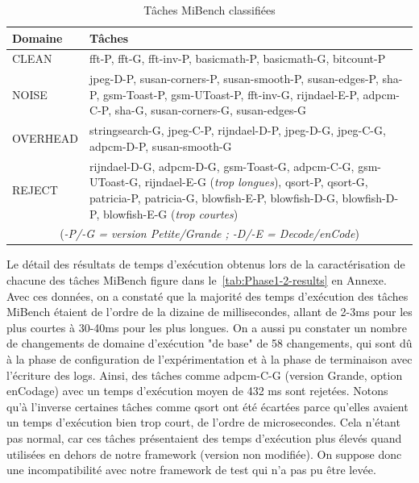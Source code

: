 \documentclass[french, a4paper, 11pt, twoside, pdftex]{StyleThese}
\begin{document}
\begin{table}[ht]
	\caption{Tâches MiBench classifiées}
	\label{tab:MiBench_classify}
	\centering
	\begin{tabularx}{\textwidth}{lX} %
		\toprule
		Domaine		& Tâches					\\
		\midrule
		CLEAN  		& fft-P, fft-G, fft-inv-P, basicmath-P, basicmath-G, bitcount-P						\\
		NOISE     	& jpeg-D-P, susan-corners-P, susan-smooth-P, susan-edges-P, sha-P, gsm-Toast-P, gsm-UToast-P, fft-inv-G, rijndael-E-P, adpcm-C-P, sha-G, susan-corners-G, susan-edges-G 		   					\\
		OVERHEAD    & stringsearch-G, jpeg-C-P, rijndael-D-P, jpeg-D-G, jpeg-C-G, adpcm-D-P, susan-smooth-G	   	\\
		REJECT      & rijndael-D-G, adpcm-D-G, gsm-Toast-G, adpcm-C-G, gsm-UToast-G, rijndael-E-G (\textit{trop longues}), qsort-P, qsort-G, patricia-P, patricia-G, blowfish-E-P, blowfish-D-G, blowfish-D-P, blowfish-E-G (\textit{trop courtes})				\\
		\bottomrule
		\multicolumn{2}{c}{(\textit{-P/-G = version Petite/Grande ; -D/-E = Decode/enCode}) }
	\end{tabularx}
\end{table}

 Le détail des résultats de temps d’exécution obtenus lors de la caractérisation de chacune des tâches MiBench figure dans le~\autoref{tab:Phase1-2-results} en Annexe. Avec ces données, on a constaté que la majorité des temps d'exécution des tâches MiBench étaient de l'ordre de la dizaine de millisecondes, allant de 2-3ms pour les plus courtes à 30-40ms pour les plus longues. On a aussi pu constater un nombre de changements de domaine d'exécution "de base" de 58 changements, qui sont dû à la phase de configuration de l'expérimentation et à la phase de terminaison avec l'écriture des logs. Ainsi, des tâches comme adpcm-C-G (version Grande, option enCodage) avec un temps d'exécution moyen de 432 ms sont rejetées. Notons qu'à l'inverse certaines tâches comme qsort ont été écartées parce qu'elles avaient un temps d'exécution bien trop court, de l'ordre de microsecondes. Cela n'étant pas normal, car ces tâches présentaient des temps d'exécution plus élevés quand utilisées en dehors de notre framework (version non modifiée). On suppose donc une incompatibilité avec notre framework de test qui n'a pas pu être levée.
\end{document}
